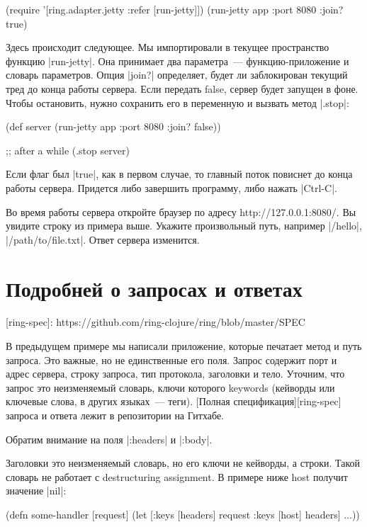 \begin{code}
(require '[ring.adapter.jetty :refer [run-jetty]])
(run-jetty app {:port 8080 :join? true})
\end{code}

Здесь происходит следующее. Мы импортировали в текущее пространство функцию
\spverb|run-jetty|. Она принимает два параметра~--- функцию-приложение и словарь
параметров. Опция \spverb|join?| определяет, будет ли заблокирован текущий тред до
конца работы сервера. Если передать false, сервер будет запущен в фоне. Чтобы
остановить, нужно сохранить его в переменную и вызвать метод \spverb|.stop|:

\begin{code}
(def server
  (run-jetty app {:port 8080
                  :join? false}))

;; after a while
(.stop server)
\end{code}

Если флаг был \spverb|true|, как в первом случае, то главный поток повиснет до конца
работы сервера. Придется либо завершить программу, либо нажать \spverb|Ctrl-C|.

Во время работы сервера откройте браузер по адресу http://127.0.0.1:8080/. Вы
увидите строку из примера выше. Укажите произвольный путь, например \spverb|/hello|,
\spverb|/path/to/file.txt|. Ответ сервера изменится.


\section{Подробней о запросах и ответах}

[ring-spec]: https://github.com/ring-clojure/ring/blob/master/SPEC

В предыдущем примере мы написали приложение, которые печатает метод и путь
запроса. Это важные, но не единственные его поля. Запрос содержит порт и адрес
сервера, строку запроса, тип протокола, заголовки и тело. Уточним, что запрос
это неизменяемый словарь, ключи которого keywords (кейворды или ключевые слова,
в других языках~--- теги). [Полная спецификация][ring-spec] запроса и ответа лежит
в репозитории на Гитхабе.

Обратим внимание на поля \spverb|:headers| и \spverb|:body|.

Заголовки это неизменяемый словарь, но его ключи не кейворды, а строки. Такой
словарь не работает с destructuring assignment. В примере ниже host получит
значение \spverb|nil|:

\begin{code}
(defn some-handler
  [request]
  (let [{:keys [headers]} request
        {:keys [host]} headers]
    ...))
\end{code}

